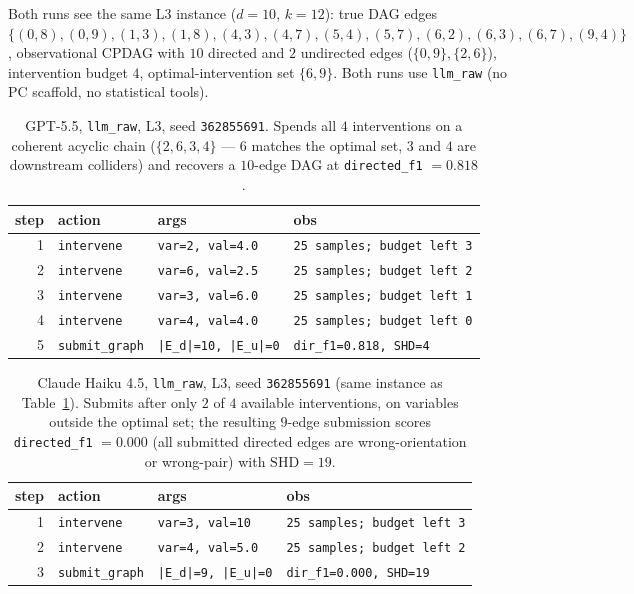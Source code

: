 Both runs see the same L3 instance ($d = 10$, $k = 12$): true DAG edges $\{(0,8), (0,9), (1,3), (1,8), (4,3), (4,7), (5,4), (5,7), (6,2), (6,3), (6,7), (9,4)\}$, observational CPDAG with $10$ directed and $2$ undirected edges ($\{0,9\}, \{2,6\}$), intervention budget $4$, optimal-intervention set $\{6, 9\}$. Both runs use \texttt{llm\_raw} (no PC scaffold, no statistical tools).

\begin{table}[h]
\centering
\small
\begin{tabular}{@{}r l l l@{}}
\toprule
step & action & args & obs \\
\midrule
1 & \texttt{intervene}    & \texttt{var=2, val=4.0}   & \texttt{25 samples; budget left 3} \\
2 & \texttt{intervene}    & \texttt{var=6, val=2.5}   & \texttt{25 samples; budget left 2} \\
3 & \texttt{intervene}    & \texttt{var=3, val=6.0}   & \texttt{25 samples; budget left 1} \\
4 & \texttt{intervene}    & \texttt{var=4, val=4.0}   & \texttt{25 samples; budget left 0} \\
5 & \texttt{submit\_graph} & \texttt{|E\_d|=10, |E\_u|=0} & \texttt{dir\_f1=0.818, SHD=4} \\
\bottomrule
\end{tabular}
\caption{GPT-5.5, \texttt{llm\_raw}, L3, seed \texttt{362855691}. Spends all $4$ interventions on a coherent acyclic chain ($\{2, 6, 3, 4\}$ — $6$ matches the optimal set, $3$ and $4$ are downstream colliders) and recovers a $10$-edge DAG at \texttt{directed\_f1} $= 0.818$.}
\label{tab:trace1}
\end{table}

\begin{table}[h]
\centering
\small
\begin{tabular}{@{}r l l l@{}}
\toprule
step & action & args & obs \\
\midrule
1 & \texttt{intervene}    & \texttt{var=3, val=10}   & \texttt{25 samples; budget left 3} \\
2 & \texttt{intervene}    & \texttt{var=4, val=5.0}  & \texttt{25 samples; budget left 2} \\
3 & \texttt{submit\_graph} & \texttt{|E\_d|=9, |E\_u|=0} & \texttt{dir\_f1=0.000, SHD=19} \\
\bottomrule
\end{tabular}
\caption{Claude Haiku 4.5, \texttt{llm\_raw}, L3, seed \texttt{362855691} (same instance as Table~\ref{tab:trace1}). Submits after only $2$ of $4$ available interventions, on variables outside the optimal set; the resulting $9$-edge submission scores \texttt{directed\_f1} $= 0.000$ (all submitted directed edges are wrong-orientation or wrong-pair) with $\mathrm{SHD} = 19$.}
\label{tab:trace2}
\end{table}

